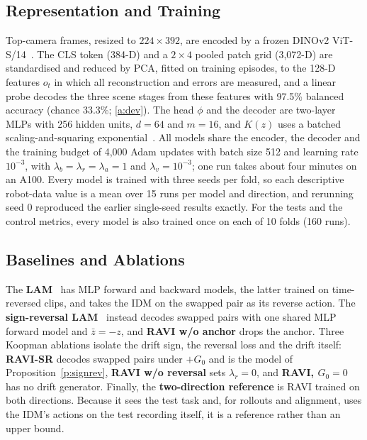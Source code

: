 \documentclass{jcse}
\newcommand{\method}{RAVI}
\newcommand{\zb}{\bar{z}}
\begin{document}
\subsection{Representation and Training}
Top-camera frames, resized to $224\times392$, are encoded by a frozen DINOv2 ViT-S/14~\cite{oquab2024dinov2}. The CLS token (384-D) and a $2\times4$ pooled patch grid (3,072-D) are standardised and reduced by PCA, fitted on training episodes, to the 128-D features $o_t$ in which all reconstruction and errors are measured, and a linear probe decodes the three scene stages from these features with 97.5\% balanced accuracy (chance 33.3\%; \ref{a:dev}).
The head $\phi$ and the decoder are two-layer MLPs with 256 hidden units, $d=64$ and $m=16$, and $K(z)$ uses a batched scaling-and-squaring exponential~\cite{higham2005scaling}.
All models share the encoder, the decoder and the training budget of 4,000 Adam updates with batch size 512 and learning rate $10^{-3}$, with $\lambda_b=\lambda_r=\lambda_a=1$ and $\lambda_v=10^{-3}$; one run takes about four minutes on an A100.
Every model is trained with three seeds per fold, so each descriptive robot-data value is a mean over 15 runs per model and direction, and rerunning seed 0 reproduced the earlier single-seed results exactly. For the tests and the control metrics, every model is also trained once on each of 10 folds (160 runs).

\subsection{Baselines and Ablations}
The \textbf{LAM}~\cite{schmidt2024lapo} has MLP forward and backward models, the latter trained on time-reversed clips, and takes the IDM on the swapped pair as its reverse action.
The \textbf{sign-reversal LAM}~\cite{tang2026alam} instead decodes swapped pairs with one shared MLP forward model and $\zb=-z$, and \textbf{{\method} w/o anchor} drops the anchor.
Three Koopman ablations isolate the drift sign, the reversal loss and the drift itself: \textbf{{\method}-SR} decodes swapped pairs under $+G_0$ and is the model of Proposition~\ref{p:signrev}, \textbf{{\method} w/o reversal} sets $\lambda_r=0$, and \textbf{{\method}, $G_0=0$} has no drift generator.
Finally, the \textbf{two-direction reference} is {\method} trained on both directions. Because it sees the test task and, for rollouts and alignment, uses the IDM's actions on the test recording itself, it is a reference rather than an upper bound.
\end{document}
